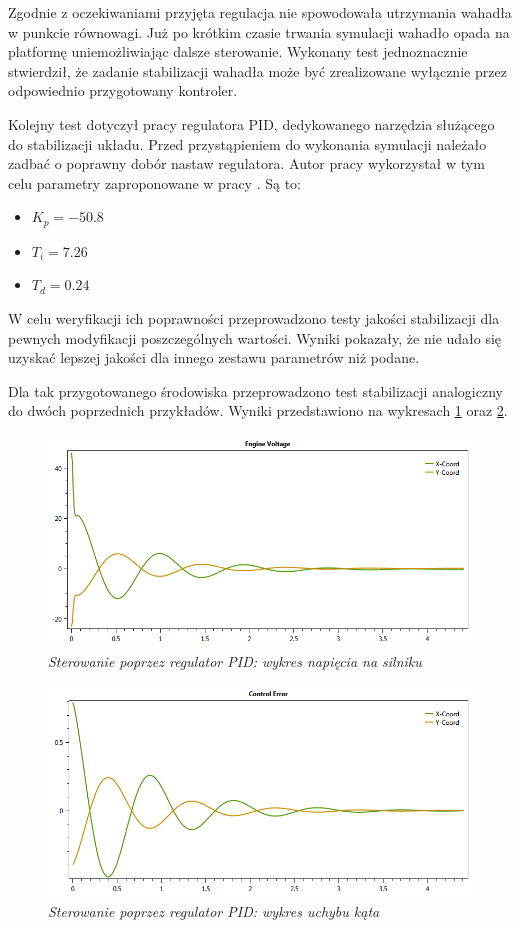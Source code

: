 \documentclass[12pt, oneside]{report}
\theoremstyle{definition}
\begin{document}
Zgodnie z oczekiwaniami przyjęta regulacja nie spowodowała utrzymania wahadła w punkcie równowagi. Już po krótkim czasie trwania symulacji wahadło opada na platformę uniemożliwiając dalsze sterowanie. Wykonany test jednoznacznie stwierdził, że zadanie stabilizacji wahadła może być zrealizowane wyłącznie przez odpowiednio przygotowany kontroler.

Kolejny test dotyczył pracy regulatora PID, dedykowanego narzędzia służącego do stabilizacji układu. Przed przystąpieniem do wykonania symulacji należało zadbać o poprawny dobór nastaw regulatora. Autor pracy wykorzystał w tym celu parametry zaproponowane w pracy \cite{JTJT}. Są to:
\begin{itemize}
\item $K_p = -50.8$
\item $T_i = 7.26$
\item $T_d = 0.24$
\end{itemize}

W celu weryfikacji ich poprawności przeprowadzono testy jakości stabilizacji dla pewnych modyfikacji poszczególnych wartości. Wyniki pokazały, że nie udało się uzyskać lepszej jakości dla innego zestawu parametrów niż podane.

Dla tak przygotowanego środowiska przeprowadzono test stabilizacji analogiczny do dwóch poprzednich przykładów. Wyniki przedstawiono na wykresach \ref{plot:PIDEV} oraz  \ref{plot:PIDCE}.

\begin{figure}[H]
	\centering
		\includegraphics[width = 350pt]{PIDEV} 
		\caption{\textit{Sterowanie poprzez regulator PID: wykres napięcia na silniku}}
		\label{plot:PIDEV}
\end{figure}

\begin{figure}[H]
	\centering
		\includegraphics[width = 350pt]{PIDCE} 
		\caption{\textit{Sterowanie poprzez regulator PID: wykres uchybu kąta}}
		\label{plot:PIDCE}
\end{figure}
\end{document}
